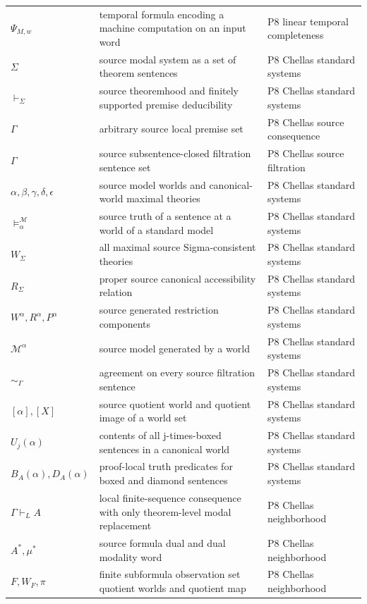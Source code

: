 \begin{longtable}{@{}p{}p{}p{}@{}}
\(\Psi_{M,w}\) & temporal formula encoding a machine computation on an input word & P8 linear temporal completeness \\
\(\Sigma\) & source modal system as a set of theorem sentences & P8 Chellas standard systems \\
\(\vdash_\Sigma\) & source theoremhood and finitely supported premise deducibility & P8 Chellas standard systems \\
\(\Gamma\) & arbitrary source local premise set & P8 Chellas source consequence \\
\(\Gamma\) & source subsentence-closed filtration sentence set & P8 Chellas source filtration \\
\(\alpha,\allowbreak \beta,\allowbreak \gamma,\allowbreak \delta,\allowbreak \epsilon\) & source model worlds and canonical-world maximal theories & P8 Chellas standard systems \\
\(\models_\alpha^{\mathcal M}\) & source truth of a sentence at a world of a standard model & P8 Chellas standard systems \\
\(W_\Sigma\) & all maximal source Sigma-consistent theories & P8 Chellas standard systems \\
\(R_\Sigma\) & proper source canonical accessibility relation & P8 Chellas standard systems \\
\(W^\alpha,\allowbreak R^\alpha,\allowbreak P^\alpha\) & source generated restriction components & P8 Chellas standard systems \\
\(\mathcal M^\alpha\) & source model generated by a world & P8 Chellas standard systems \\
\(\sim_\Gamma\) & agreement on every source filtration sentence & P8 Chellas standard systems \\
\([\alpha],\allowbreak [X]\) & source quotient world and quotient image of a world set & P8 Chellas standard systems \\
\(U_j(\alpha)\) & contents of all j-times-boxed sentences in a canonical world & P8 Chellas standard systems \\
\(B_A(\alpha),\allowbreak D_A(\alpha)\) & proof-local truth predicates for boxed and diamond sentences & P8 Chellas standard systems \\
\(\Gamma\vdash_L A\) & local finite-sequence consequence with only theorem-level modal replacement & P8 Chellas neighborhood \\
\(A^*,\allowbreak \mu^*\) & source formula dual and dual modality word & P8 Chellas neighborhood \\
\(F,\allowbreak W_F,\allowbreak \pi\) & finite subformula observation set quotient worlds and quotient map & P8 Chellas neighborhood \\

\end{longtable}
